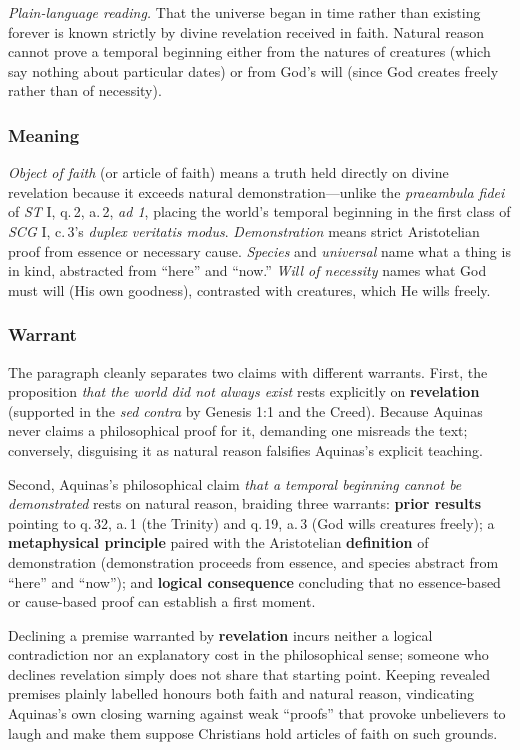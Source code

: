 \emph{Plain-language reading.} That the universe began in time rather than existing forever is known strictly by divine revelation received in faith. Natural reason cannot prove a temporal beginning either from the natures of creatures (which say nothing about particular dates) or from God's will (since God creates freely rather than of necessity).

\subsubsection*{Meaning}
\emph{Object of faith} (or article of faith) means a truth held directly on divine revelation because it exceeds natural demonstration---unlike the \emph{praeambula fidei} of \emph{ST} I, q.\,2, a.\,2, \emph{ad 1}, placing the world's temporal beginning in the first class of \emph{SCG} I, c.\,3's \emph{duplex veritatis modus}. \emph{Demonstration} means strict Aristotelian proof from essence or necessary cause. \emph{Species} and \emph{universal} name what a thing is in kind, abstracted from ``here'' and ``now.'' \emph{Will of necessity} names what God must will (His own goodness), contrasted with creatures, which He wills freely.

\subsubsection*{Warrant}
The paragraph cleanly separates two claims with different warrants. First, the proposition \emph{that the world did not always exist} rests explicitly on \textbf{revelation} (supported in the \emph{sed contra} by Genesis 1:1 and the Creed). Because Aquinas never claims a philosophical proof for it, demanding one misreads the text; conversely, disguising it as natural reason falsifies Aquinas's explicit teaching.

Second, Aquinas's philosophical claim \emph{that a temporal beginning cannot be demonstrated} rests on natural reason, braiding three warrants: \textbf{prior results} pointing to q.\,32, a.\,1 (the Trinity) and q.\,19, a.\,3 (God wills creatures freely); a \textbf{metaphysical principle} paired with the Aristotelian \textbf{definition} of demonstration (demonstration proceeds from essence, and species abstract from ``here'' and ``now''); and \textbf{logical consequence} concluding that no essence-based or cause-based proof can establish a first moment.

Declining a premise warranted by \textbf{revelation} incurs neither a logical contradiction nor an explanatory cost in the philosophical sense; someone who declines revelation simply does not share that starting point. Keeping revealed premises plainly labelled honours both faith and natural reason, vindicating Aquinas's own closing warning against weak ``proofs'' that provoke unbelievers to laugh and make them suppose Christians hold articles of faith on such grounds.

